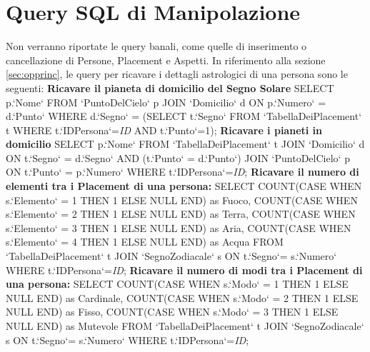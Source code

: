 \section{Query SQL di Manipolazione}
Non verranno riportate le query banali, come quelle di inserimento o cancellazione di Persone, Placement e Aspetti. In riferimento alla sezione \ref{sec:opprinc}, le query per ricavare i dettagli astrologici di una persona sono le seguenti:\newline\newline\newline
\textbf{Ricavare il pianeta di domicilio del Segno Solare}\newline
SELECT p.`Nome` FROM `PuntoDelCielo` p JOIN `Domicilio` d ON p.`Numero` = d.`Punto` WHERE d.`Segno` =
(SELECT t.`Segno` FROM `TabellaDeiPlacement` t WHERE t.`IDPersona`=\textit{ID} AND t.`Punto`=1);\newline\newline
\textbf{Ricavare i pianeti in domicilio}\newline
SELECT p.`Nome` FROM `TabellaDeiPlacement` t JOIN `Domicilio` d \newline
ON t.`Segno` = d.`Segno` AND (t.`Punto` = d.`Punto`) \newline
JOIN `PuntoDelCielo` p ON t.`Punto` = p.`Numero` WHERE t.`IDPersona`=\textit{ID};\newline\newline
\textbf{Ricavare il numero di elementi tra i Placement di una persona:}\newline
SELECT COUNT(CASE WHEN s.`Elemento` = 1 THEN 1 ELSE NULL END) as Fuoco,
       COUNT(CASE WHEN s.`Elemento` = 2 THEN 1 ELSE NULL END) as Terra,
       COUNT(CASE WHEN s.`Elemento` = 3 THEN 1 ELSE NULL END) as Aria,
       COUNT(CASE WHEN s.`Elemento` = 4 THEN 1 ELSE NULL END) as Acqua
FROM `TabellaDeiPlacement` t JOIN `SegnoZodiacale` s ON t.`Segno`= s.`Numero` WHERE t.`IDPersona`=\textit{ID};\newline\newline
\textbf{Ricavare il numero di modi tra i Placement di una persona:}\newline
SELECT COUNT(CASE WHEN s.`Modo` = 1 THEN 1 ELSE NULL END) as Cardinale,
       COUNT(CASE WHEN s.`Modo` = 2 THEN 1 ELSE NULL END) as Fisso,
       COUNT(CASE WHEN s.`Modo` = 3 THEN 1 ELSE NULL END) as Mutevole
FROM `TabellaDeiPlacement` t JOIN `SegnoZodiacale` s ON t.`Segno`= s.`Numero` WHERE t.`IDPersona`=\textit{ID};\newline\newline
